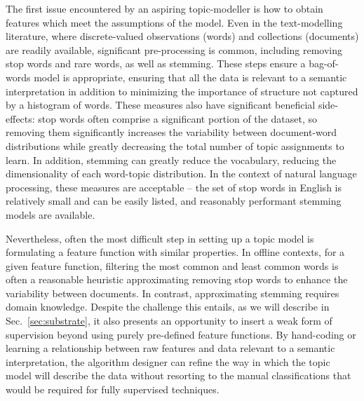 The first issue encountered by an aspiring topic-modeller is how to obtain features which meet the assumptions of the model. Even in the text-modelling literature, where discrete-valued observations (words) and collections (documents) are readily available, significant pre-processing is common, including removing stop words and rare words, as well as stemming. These steps ensure a bag-of-words model is appropriate, ensuring that all the data is relevant to a semantic interpretation in addition to minimizing the importance of structure not captured by a histogram of words. These measures also have significant beneficial side-effects: stop words often comprise a significant portion of the dataset, so removing them significantly increases the variability between document-word distributions while greatly decreasing the total number of topic assignments to learn. In addition, stemming can greatly reduce the vocabulary, reducing the dimensionality of each word-topic distribution. In the context of natural language processing, these measures are acceptable -- the set of stop words in English is relatively small and can be easily listed, and reasonably performant stemming models are available.

Nevertheless, often the most difficult step in setting up a topic model is formulating a feature function with similar properties. In offline contexts, for a given feature function, filtering the most common and least common words is often a reasonable heuristic approximating removing stop words to enhance the variability between documents. In contrast, approximating stemming requires domain knowledge. Despite the challenge this entails, as we will describe in Sec.~\ref{sec:substrate}, it also presents an opportunity to insert a weak form of supervision beyond using purely pre-defined feature functions. By hand-coding or learning a relationship between raw features and data relevant to a semantic interpretation, the algorithm designer can refine the way in which the topic model will describe the data without resorting to the manual classifications that would be required for fully supervised techniques.


